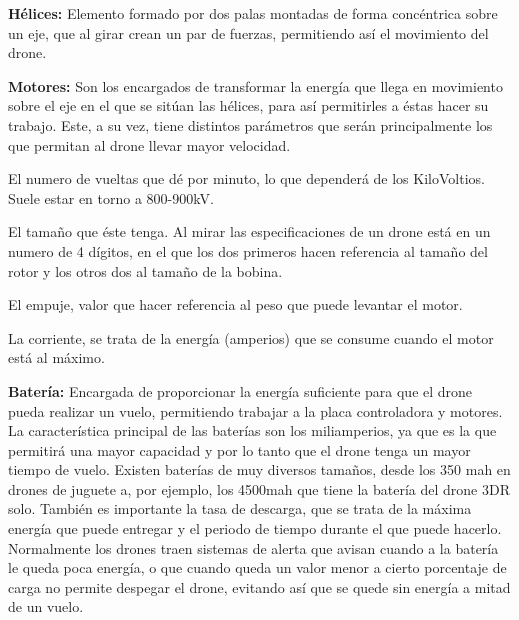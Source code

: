 \hspace{1 cm}\textbf{H\'elices:} Elemento formado por dos palas montadas de forma conc\'entrica sobre un eje, que al girar crean un par de fuerzas, permitiendo as\'i el movimiento del drone.

\hspace{1 cm}\textbf{Motores:} Son los encargados de transformar la energ\'ia que llega en movimiento sobre el eje en el que se sit\'uan las h\'elices, para as\'i permitirles a \'estas hacer su trabajo. Este, a su vez, tiene distintos par\'ametros que ser\'an principalmente los que permitan al drone llevar mayor velocidad. 

\hspace{1 cm} El numero de vueltas que d\'e por minuto, lo que depender\'a de los KiloVoltios. Suele estar en torno a 800-900kV.

\hspace{1 cm} El tamaño que \'este tenga. Al mirar las especificaciones de un drone est\'a en un numero de 4 d\'igitos, en el que los dos primeros hacen referencia al tamaño del rotor y los otros dos al tamaño de la bobina. 

\hspace{1 cm} El empuje, valor que hacer referencia al peso que puede levantar el motor.

\hspace{1 cm} La corriente, se trata de la energ\'ia (amperios) que se consume cuando el motor est\'a al m\'aximo.


\hspace{1 cm}\textbf{Bater\'ia:} Encargada de proporcionar la energ\'ia suficiente para que el drone pueda realizar un vuelo, permitiendo trabajar a la placa controladora y motores. La caracter\'istica principal de las bater\'ias son los miliamperios, ya que es la que permitir\'a una mayor capacidad y por lo tanto que el drone tenga un mayor tiempo de vuelo. Existen bater\'ias de muy diversos tamaños, desde los 350 mah en drones de juguete a, por ejemplo, los 4500mah que tiene la bater\'ia del drone 3DR solo. Tambi\'en es importante la tasa de descarga, que se trata de la m\'axima energ\'ia que puede entregar y el periodo de tiempo durante el que puede hacerlo. Normalmente los drones traen sistemas de alerta que avisan cuando a la bater\'ia le queda poca energ\'ia, o que cuando queda un valor menor a cierto porcentaje de carga no permite despegar el drone, evitando as\'i que se quede sin energ\'ia a mitad de un vuelo.

